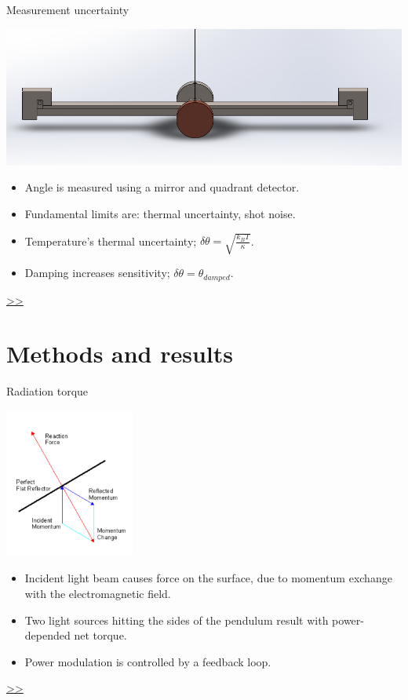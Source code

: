 \documentclass{beamer}
\begin{document}
\begin{frame}{\hypertarget{frame:Measurement uncertainty}{Measurement uncertainty}}
	\begin{center}		
		\includegraphics[width=1\textwidth,keepaspectratio]{pendulum_front.png}
    \end{center}
	\begin{itemize}
		
		\item Angle is measured using a mirror and quadrant detector.
		\item Fundamental limits are: thermal uncertainty, shot noise. 
		\item Temperature’s thermal uncertainty; $\delta\theta = \sqrt{\frac{k_B T}{\kappa}}$. 
		\item Damping increases sensitivity; $  \delta\theta =  \theta_{damped}$.

		
	\end{itemize}
	\hyperlink{frame:Measurement uncertainty 1}{>>} 
\end{frame}
\section{Methods and results}
\begin{frame}{\hypertarget{frame:Radiation torque}{Radiation torque}}
	\begin{center}		
		\includegraphics[width=0.32\textwidth,keepaspectratio]{radiation.PNG}
    \end{center}

	
	\begin{itemize}		
		
		\item Incident light beam causes force on the surface, due to momentum exchange with the electromagnetic field.
		\item Two light sources hitting the sides of the pendulum result with power-depended net torque.
		\item Power modulation is controlled by a feedback loop.
		
	\end{itemize}
	\hyperlink{frame:Radiation torque 1}{>>} 
\end{frame}
\end{document}
